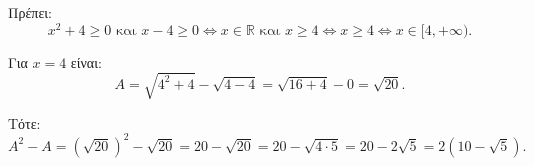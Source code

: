 
\begin{alist}
\item Πρέπει:
\[x^2 + 4 \ge 0 \text{ και } x - 4 \ge 0 \Leftrightarrow x \in \mathbb{R} \text{ και } x \ge 4 \Leftrightarrow x \ge 4 \Leftrightarrow x \in [4, +\infty).\]

\item Για $x = 4$ είναι:
\[A = \sqrt{4^2 + 4} - \sqrt{4 - 4} = \sqrt{16 + 4} - 0 = \sqrt{20}.\]

Τότε:
\[A^2 - A = (\sqrt{20})^2 - \sqrt{20} = 20 - \sqrt{20} = 20 - \sqrt{4 \cdot 5} = 20 - 2\sqrt{5} = 2(10 - \sqrt{5}).\]
\end{alist}

